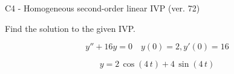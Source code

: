 \begin{exercise}
  \begin{exerciseTitle}C4 - Homogeneous second-order linear IVP (ver. 72)\end{exerciseTitle}
  \begin{exerciseStatement}
    
Find the solution to the given IVP.

    
\[y''+16y = 0 \hspace{1em} y(0) = 2 , y'(0) = 16\]

  \end{exerciseStatement}
  \begin{exerciseAnswer}
    
\[y= 2 \, \cos\left(4 \, t\right) + 4 \, \sin\left(4 \, t\right)\]

  \end{exerciseAnswer}
\end{exercise}